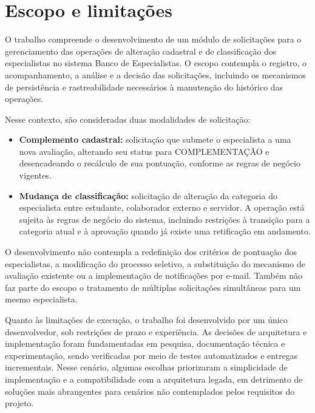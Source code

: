 \section{Escopo e limitações}
\label{sec:escopo-limitacoes}

O trabalho compreende o desenvolvimento de um módulo de solicitações para o
gerenciamento das operações de alteração cadastral e de classificação dos
especialistas no sistema Banco de Especialistas. O escopo contempla o registro,
o acompanhamento, a análise e a decisão das solicitações, incluindo os
mecanismos de persistência e rastreabilidade necessários à manutenção do
histórico das operações.

Nesse contexto, são consideradas duas modalidades de solicitação:

\begin{itemize}
    \item \textbf{Complemento cadastral:} solicitação que submete o especialista
    a uma nova avaliação, alterando seu status para COMPLEMENTAÇÃO e
    desencadeando o recálculo de sua pontuação, conforme as regras de negócio
    vigentes.

    \item \textbf{Mudança de classificação:} solicitação de alteração da
    categoria do especialista entre estudante, colaborador externo e servidor.
    A operação está sujeita às regras de negócio do sistema, incluindo
    restrições à transição para a categoria atual e à aprovação quando já existe
    uma retificação em andamento.
\end{itemize}

O desenvolvimento não contempla a redefinição dos critérios de pontuação dos
especialistas, a modificação do processo seletivo, a substituição do mecanismo
de avaliação existente ou a implementação de notificações por e-mail.
Também não faz parte do escopo o tratamento de múltiplas solicitações
simultâneas para um mesmo especialista.

Quanto às limitações de execução, o trabalho foi desenvolvido por um único
desenvolvedor, sob restrições de prazo e experiência. As decisões de
arquitetura e implementação foram fundamentadas em pesquisa, documentação
técnica e experimentação, sendo verificadas por meio de testes automatizados
e entregas incrementais. Nesse cenário, algumas escolhas priorizaram a
simplicidade de implementação e a compatibilidade com a arquitetura legada,
em detrimento de soluções mais abrangentes para cenários não contemplados
pelos requisitos do projeto.

